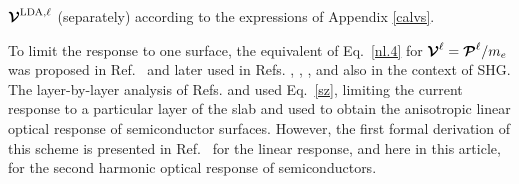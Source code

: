 \documentclass[floatfix,prb,aps,superscriptaddress,11pt,preprint,letterpaper]{revtex4}
\begin{document}
$\boldsymbol{\mathcal{\cal V}}^{\mathrm{LDA},\ell}$ (separately)
according to the expressions of
Appendix \ref{calvs}.

To limit the response to one surface, the equivalent of Eq.~\eqref{nl.4} 
for $\boldsymbol{\mathcal{\cal V}}^\ell=\boldsymbol{\mathcal{\cal P}}^\ell/m_e$ was proposed in 
Ref.~ and later used in Refs.
,
,
,
 and  
also in the context of SHG. 
The layer-by-layer analysis of Refs.  
and  used Eq.~\eqref{sz}, 
limiting the current response
to a particular layer of the slab and used to obtain the
anisotropic linear optical response of semiconductor surfaces.
However, the first formal derivation of this scheme is presented in
Ref.~ for the linear response, and here in this 
article, for the second harmonic optical response of semiconductors.
\end{document}
